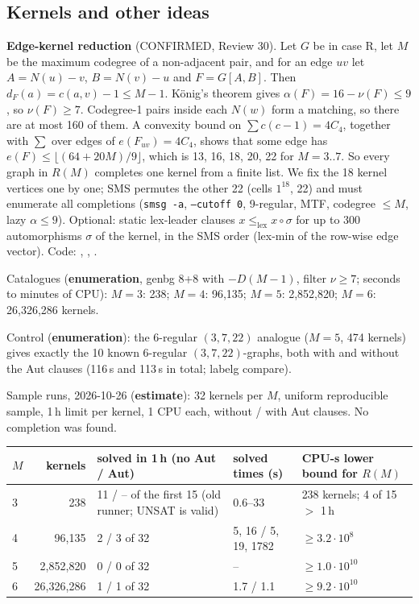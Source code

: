 \subsection{Kernels and other ideas}\label{sec:hard-kernels}
\textbf{Edge-kernel reduction} (CONFIRMED, Review 30). Let $G$ be in case R, let $M$ be the maximum
codegree of a non-adjacent pair, and for an edge $uv$ let $A = N(u) - v$, $B = N(v) - u$ and $F = G[A, B]$. Then
$d_F(a) = c(a, v) - 1 \le M - 1$. K\"onig's theorem gives $\alpha(F) = 16 - \nu(F) \le 9$, so $\nu(F) \ge 7$. Codegree-1
pairs inside each $N(w)$ form a matching, so there are at most 160 of them. A convexity bound on
$\sum c(c-1) = 4 C_4$, together with $\sum$ over edges of $e(F_{uv}) = 4 C_4$, shows that some edge has
$e(F) \le \lfloor (64 + 20M)/9 \rfloor$, which is 13, 16, 18, 20, 22 for $M = 3..7$. So every graph in $R(M)$ completes one kernel from a
finite list. We fix the 18 kernel vertices one by one; SMS permutes the other 22 (cells $1^{18}$, 22) and must enumerate
all completions (\texttt{smsg -a}, \texttt{--cutoff 0}, 9-regular, MTF, codegree $\le M$, lazy $\alpha \le 9$). Optional: static
lex-leader clauses $x \le_{\mathrm{lex}} x \circ \sigma$ for up to 300 automorphisms $\sigma$ of the kernel, in the SMS order
(lex-min of the row-wise edge vector). Code: , , .

Catalogues (\textbf{enumeration}, genbg 8+8 with $-D(M-1)$, filter $\nu \ge 7$; seconds to minutes of CPU):
$M = 3$: 238; $M = 4$: 96,135; $M = 5$: 2,852,820; $M = 6$: 26,326,286 kernels.

Control (\textbf{enumeration}): the 6-regular $(3,7,22)$ analogue ($M = 5$, 474 kernels) gives exactly the 10 known
6-regular $(3,7,22)$-graphs, both with and without the Aut clauses (116\,s and 113\,s in total; labelg compare).

Sample runs, 2026-10-26 (\textbf{estimate}): 32 kernels per $M$, uniform reproducible sample, 1\,h limit per kernel, 1 CPU
each, without / with Aut clauses. No completion was found.

\begin{center}\small
\begin{tabular}{@{}l r p{3.6cm} p{2.6cm} p{3.6cm}@{}}
\toprule
$M$ & kernels & solved in 1\,h (no Aut / Aut) & solved times (s) & CPU-s lower bound for $R(M)$ \\
\midrule
3 & 238 & 11 / -- of the first 15 (old runner; UNSAT is valid) & 0.6--33 & 238 kernels; 4 of 15 $>$ 1\,h \\
4 & 96,135 & 2 / 3 of 32 & 5, 16 / 5, 19, 1782 & $\ge 3.2\cdot 10^{8}$ \\
5 & 2,852,820 & 0 / 0 of 32 & -- & $\ge 1.0\cdot 10^{10}$ \\
6 & 26,326,286 & 1 / 1 of 32 & 1.7 / 1.1 & $\ge 9.2\cdot 10^{10}$ \\
\bottomrule
\end{tabular}
\end{center}

